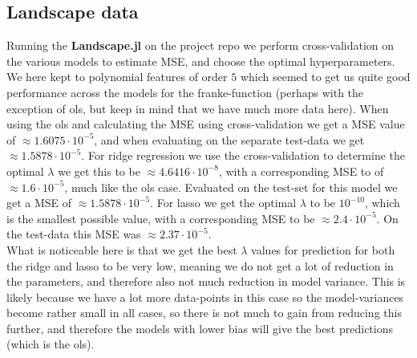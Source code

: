 \documentclass{article}
\begin{document}
\subsection{Landscape data}
Running the \textbf{Landscape.jl} on the project repo \cite{githubrepoproject1}
we perform cross-validation on the various models to estimate MSE, and choose
the optimal hyperparameters. We here kept to polynomial features of order $5$
which seemed to get us quite good performance across the models for the
franke-function (perhaps with the exception of ols, but keep in mind that we
have much more data here). When using the ols and calculating the MSE using
cross-validation we get a MSE value of $\approx 1.6075\cdot 10^{-5}$, and when
evaluating on the separate test-data we get $\approx 1.5878 \cdot 10^{-5}$. For
ridge regression we use the cross-validation to determine the optimal $\lambda$
we get this to be $\approx 4.6416 \cdot 10^{-8}$, with a corresponding MSE to
of $\approx 1.6 \cdot 10^{-5}$, much like the ols case. Evaluated on the
test-set for this model we get a MSE of $\approx 1.5878 \cdot 10^{-5}$. For
lasso we get the optimal $\lambda$ to be $10^{-10}$, which is the smallest
possible value, with a corresponding MSE to be $\approx 2.4 \cdot 10^{-5}$. On
the test-data this MSE was $\approx 2.37 \cdot 10^{-5}$.
\\
What is noticeable here is that we get the best $\lambda$ values for prediction
for both the ridge and lasso to be very low, meaning we do not get a lot of
reduction in the parameters, and therefore also not much reduction in model variance. This
is likely because we have a lot more data-points in this case so the
model-variances become rather small in all cases, so there is not much to gain
from reducing this further, and therefore the models with lower bias will give
the best predictions (which is the ols).
\end{document}
